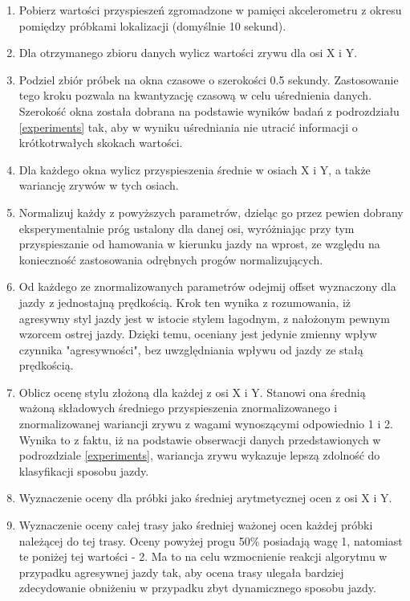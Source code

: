 \begin{enumerate}
\item Pobierz wartości przyspieszeń zgromadzone w pamięci akcelerometru z okresu pomiędzy próbkami lokalizacji (domyślnie 10 sekund).
\item Dla otrzymanego zbioru danych wylicz wartości zrywu dla osi X i Y.
\item Podziel zbiór próbek na okna czasowe o szerokości 0.5 sekundy. Zastosowanie tego kroku pozwala na kwantyzację czasową w celu uśrednienia danych. Szerokość okna została dobrana na podstawie wyników badań z podrozdziału \ref{experiments} tak, aby w wyniku uśredniania nie utracić informacji o krótkotrwałych skokach wartości.
\item Dla każdego okna wylicz przyspieszenia średnie w osiach X i Y, a także wariancję zrywów w tych osiach.
\item Normalizuj każdy z powyższych parametrów, dzieląc go przez pewien dobrany eksperymentalnie próg ustalony dla danej osi, wyróżniając przy tym przyspieszanie od hamowania w kierunku jazdy na wprost, ze względu na konieczność zastosowania odrębnych progów normalizujących.
\item Od każdego ze znormalizowanych parametrów odejmij offset wyznaczony dla jazdy z jednostajną prędkością. Krok ten wynika z rozumowania, iż agresywny styl jazdy jest w istocie stylem łagodnym, z nałożonym pewnym wzorcem ostrej jazdy. Dzięki temu, oceniany jest jedynie zmienny wpływ czynnika "agresywności", bez uwzględniania wpływu od jazdy ze stałą prędkością.
\item Oblicz ocenę stylu złożoną dla każdej z osi X i Y. Stanowi ona średnią ważoną składowych średniego przyspieszenia znormalizowanego i znormalizowanej wariancji zrywu z wagami wynoszącymi odpowiednio 1 i 2. Wynika to z faktu, iż na podstawie obserwacji danych przedstawionych w podrozdziale \ref{experiments}, wariancja zrywu wykazuje lepszą zdolność do klasyfikacji sposobu jazdy.
\item Wyznaczenie oceny dla próbki jako średniej arytmetycznej ocen z osi X i Y.
\item Wyznaczenie oceny całej trasy jako średniej ważonej ocen każdej próbki należącej do tej trasy. Oceny powyżej progu 50\% posiadają wagę 1, natomiast te poniżej tej wartości - 2. Ma to na celu wzmocnienie reakcji algorytmu w przypadku agresywnej jazdy tak, aby ocena trasy ulegała bardziej zdecydowanie obniżeniu w przypadku zbyt dynamicznego sposobu jazdy.
\end{enumerate}

